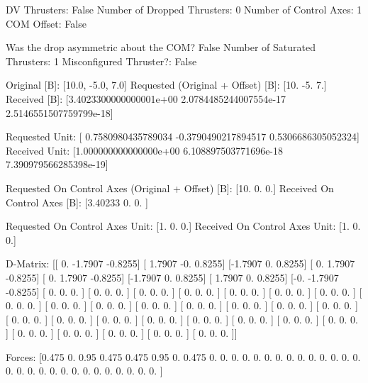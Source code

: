 DV Thrusters:	False
Number of Dropped Thrusters:	0
Number of Control Axes:	1
COM Offset:	False

Was the drop asymmetric about the COM?	False
Number of Saturated Thrusters:	1
Misconfigured Thruster?:	False

Original [B]:	[10.0, -5.0, 7.0]
Requested (Original + Offset) [B]:	[10. -5.  7.]
Received [B]:		[3.4023300000000001e+00 2.0784485244007554e-17 2.5146551507759799e-18]

Requested Unit:		[ 0.7580980435789034 -0.3790490217894517  0.5306686305052324]
Received Unit:		[1.000000000000000e+00 6.108897503771696e-18 7.390979566285398e-19]

Requested On Control Axes (Original + Offset) [B]:	[10.  0.  0.]
Received On Control Axes [B]:		[3.40233 0.      0.     ]

Requested On Control Axes Unit:		[1. 0. 0.]
Received On Control Axes Unit:		[1. 0. 0.]

D-Matrix:
[[ 0.     -1.7907 -0.8255]
 [ 1.7907 -0.      0.8255]
 [-1.7907  0.      0.8255]
 [ 0.      1.7907 -0.8255]
 [ 0.      1.7907 -0.8255]
 [-1.7907  0.      0.8255]
 [ 1.7907  0.      0.8255]
 [-0.     -1.7907 -0.8255]
 [ 0.      0.      0.    ]
 [ 0.      0.      0.    ]
 [ 0.      0.      0.    ]
 [ 0.      0.      0.    ]
 [ 0.      0.      0.    ]
 [ 0.      0.      0.    ]
 [ 0.      0.      0.    ]
 [ 0.      0.      0.    ]
 [ 0.      0.      0.    ]
 [ 0.      0.      0.    ]
 [ 0.      0.      0.    ]
 [ 0.      0.      0.    ]
 [ 0.      0.      0.    ]
 [ 0.      0.      0.    ]
 [ 0.      0.      0.    ]
 [ 0.      0.      0.    ]
 [ 0.      0.      0.    ]
 [ 0.      0.      0.    ]
 [ 0.      0.      0.    ]
 [ 0.      0.      0.    ]
 [ 0.      0.      0.    ]
 [ 0.      0.      0.    ]
 [ 0.      0.      0.    ]
 [ 0.      0.      0.    ]
 [ 0.      0.      0.    ]
 [ 0.      0.      0.    ]
 [ 0.      0.      0.    ]
 [ 0.      0.      0.    ]]

Forces:
[0.475 0.    0.95  0.475 0.475 0.95  0.    0.475 0.    0.    0.    0.
 0.    0.    0.    0.    0.    0.    0.    0.    0.    0.    0.    0.
 0.    0.    0.    0.    0.    0.    0.    0.    0.    0.    0.    0.   ]

